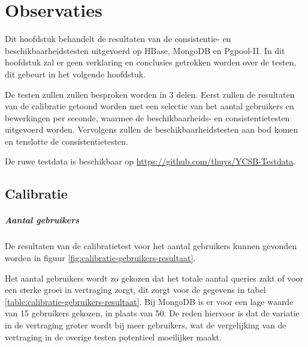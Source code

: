 \chapter{Observaties}\label{sec:observaties}
Dit hoofdstuk behandelt de resultaten van de consistentie- en beschikbaarheidstesten uitgevoerd op HBase, MongoDB en Pgpool-II. In dit hoofdstuk zal er geen verklaring en conclusies getrokken worden over de testen, dit gebeurt in het volgende hoofdstuk. 

De testen zullen zullen besproken worden in 3 delen. Eerst zullen de resultaten van de calibratie getoond worden met een selectie van het aantal gebruikers en bewerkingen per seconde, waarmee de beschikbaarheids- en consistentietesten uitgevoerd worden. Vervolgens zullen de beschikbaarheidstesten aan bod komen en tenslotte de consistentietesten. 

De ruwe testdata is beschikbaar op \url{https://github.com/thuys/YCSB-Testdata}. 

\section{Calibratie}


\paragraph{Aantal gebruikers}
De resultaten van de calibratietest voor het aantal gebruikers kunnen gevonden worden in figuur \ref{fig:calibratie-gebruikers-resultaat}. 

Het aantal gebruikers wordt zo gekozen dat het totale aantal queries zakt of voor een sterke groei in vertraging zorgt, dit zorgt voor de gegevens in tabel \ref{table:calibratie-gebruikers-resultaat}. Bij MongoDB is er voor een lage waarde van 15 gebruikers gekozen, in plaats van 50. De reden hiervoor is dat de variatie in de vertraging groter wordt bij meer gebruikers, wat de vergelijking van de vertraging in de overige testen potentieel moeilijker maakt.  

